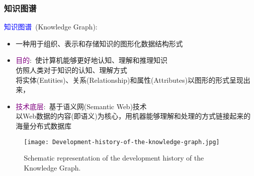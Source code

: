 \frame
{
	\frametitle{知识图谱}
	\textcolor{blue}{知识图谱}~\textrm{(Knowledge Graph)}:
	\begin{itemize}
		\item 一种用于组织、表示和存储知识的图形化数据结构形式
		\item \textcolor{purple}{目的}:~使计算机能够更好地认知、理解和推理知识\\
			仿照人类对于知识的认知、理解方式\\
			将实体\textrm{(Entities)}、关系\textrm{(Relationship)}和属性\textrm{(Attributes)}以图形的形式呈现出来，
		\item \textcolor{purple}{技术底层}:~基于语义网\textrm{(Semantic Web)}技术\\
			以\textrm{Web}数据的内容(即语义)为核心，用机器能够理解和处理的方式链接起来的海量分布式数据库
	\end{itemize}
\begin{figure}[h!]
\centering
\vskip -8pt
\texttt{[image: Development-history-of-the-knowledge-graph.jpg]}
\caption{\tiny\textrm{Schematic representation of the development history of the Knowledge Graph.}}%
\label{Fig:Knowledge-history}
\end{figure}
}
